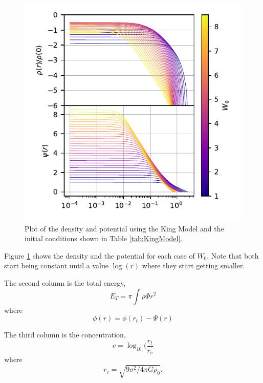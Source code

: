 \begin{figure}
    \centering
    \includegraphics{CodeAndFigures/KingModelPlots.pdf}
    \caption{Plot of the density and potential using the King Model and the initial conditions shown in Table \ref{tab:KingModel}.}
    \label{fig:KingDensityPotential}
\end{figure}

Figure \ref{fig:KingDensityPotential} shows the density and the potential for each case of $W_0$. Note that both start being constant until a value $\log(r)$ where they start getting smaller. 

The second column is the total energy,
\begin{equation}
    E_T=\pi\int\rho\Phi r^2
    \label{eq:TotalEnergy}
\end{equation}
where 
\begin{equation}
    \phi(r) = \phi(r_t)-\Psi(r)
    \label{eq: Potential}
\end{equation}

The third column is the concentration,
\begin{equation}
    c = \log_10(\frac{r_t}{r_c}
\end{equation}
where
\begin{equation}
    r_c=\sqrt{9\sigma^2/4\pi G \rho_0}.
\end{equation}

